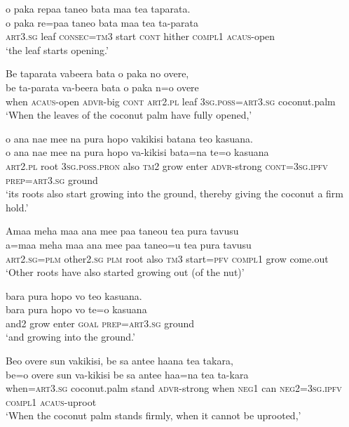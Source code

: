 \ea\label{ex:text01-14}
o paka repaa taneo bata maa tea taparata.\\
\gll o	paka	re=paa	taneo	bata	maa	tea	ta-parata\\
     \textsc{art}3.\textsc{sg}	leaf	\textsc{consec}=\textsc{tm}3	start	\textsc{cont}	hither	\textsc{compl}1	\textsc{acaus}-open\\
\glt `the leaf starts opening.'
\z

\ea\label{ex:text01-15}
Be taparata vabeera bata o paka no overe,\\
\gll be	ta-parata	va-beera	bata	o	paka	n=o	overe\\
     when	\textsc{acaus}-open	\textsc{advr}-big	\textsc{cont}	\textsc{art}2.\textsc{pl}	leaf	3\textsc{sg}.\textsc{poss}=\textsc{art}3.\textsc{sg}	coconut.palm\\
\glt `When the leaves of the coconut palm have fully opened,'
\z

\ea\label{ex:text01-16}
o ana nae mee na pura hopo vakikisi batana teo kasuana.\\
\gll o	ana	nae	mee	na	pura	hopo	va-kikisi	bata=na	te=o	kasuana\\
     \textsc{art}2.\textsc{pl}	root	3\textsc{sg}.\textsc{poss}.\textsc{pron}	also	\textsc{tm}2	grow	enter	\textsc{advr}-strong	\textsc{cont}=3\textsc{sg}.\textsc{ipfv}	\textsc{prep}=\textsc{art}3.\textsc{sg}	ground\\
\glt `its roots also start growing into the ground, thereby giving the coconut a firm hold.'
\z

\ea\label{ex:text01-17}
Amaa meha maa ana mee paa taneou tea pura tavusu\\
\gll a=maa	meha	maa	ana	mee	paa	taneo=u	tea	pura	tavusu\\
     \textsc{art}2.\textsc{sg}=\textsc{plm}	other2.\textsc{sg}	\textsc{plm}	root	also	\textsc{tm}3	start=\textsc{pfv}	\textsc{compl}1	grow	come.out\\
\glt `Other roots have also started growing out (of the nut)'
\z

\ea\label{ex:text01-18}
bara pura hopo vo teo kasuana.\\
\gll bara	pura	hopo	vo	te=o	kasuana\\
     and2	grow	enter	\textsc{goal}	\textsc{prep}=\textsc{art}3.\textsc{sg}	ground\\
\glt `and growing into the ground.'
\z

\ea\label{ex:text01-19}
Beo overe sun vakikisi, be sa antee haana tea takara,\\
\gll be=o	overe	sun	va-kikisi	be	sa	antee	haa=na	tea	ta-kara\\
     when=\textsc{art}3.\textsc{sg}	coconut.palm	stand	\textsc{advr}-strong	when	\textsc{neg}1	can	\textsc{neg}2=3\textsc{sg}.\textsc{ipfv}	\textsc{compl}1	\textsc{acaus}-uproot\\
\glt `When the coconut palm stands firmly, when it cannot be uprooted,'
\z

